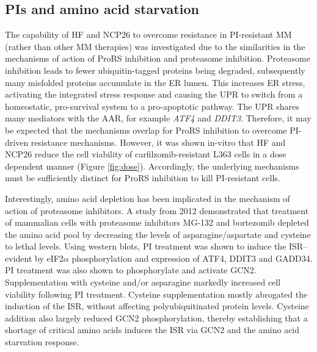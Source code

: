 \subsection{PIs and amino acid starvation}
The capability of HF and NCP26 to overcome resistance in PI-resistant MM (rather than other MM therapies) was investigated due to the similarities in the mechanisms of action of ProRS inhibition and proteasome inhibition.
Proteasome inhibition leads to fewer ubiquitin-tagged proteins being degraded, subsequently many misfolded proteins accumulate in the ER lumen.
This increases ER stress, activating the integrated stress response and causing the UPR to switch from a homeostatic, pro-survival system to a pro-apoptotic pathway\cite{kubiczkova2014proteasome, wallington2018resistance}.
The UPR shares many mediators with the AAR, for example \textit{ATF4} and \textit{DDIT3}.
Therefore, it may be expected that the mechanisms overlap for ProRS inhibition to overcome PI-driven resistance mechanisms.
However, it was shown in-vitro that HF and NCP26 reduce the cell viability of carfilzomib-resistant L363 cells in a dose dependent manner (Figure \ref{fig:dose}).
Accordingly, the underlying mechanisms must be sufficiently distinct for ProRS inhibition to kill PI-resistant cells.

Interestingly, amino acid depletion has been implicated in the mechanism of action of proteasome inhibitors\cite{suraweera2012failure}.
A study from 2012 demonstrated that treatment of mammalian cells with proteasome inhibitors MG-132 and bortezomib depleted the amino acid pool by decreasing the levels of asparagine/aspartate and cysteine to lethal levels\cite{suraweera2012failure}.
Using western blots, PI treatment was shown to induce the ISR-- evident by eIF2$\alpha$ phosphorylation and expression of ATF4, DDIT3 and GADD34.
PI treatment was also shown to phosphorylate and activate GCN2.
Supplementation with cysteine and/or asparagine markedly increased cell viability following PI treatment.
Cysteine supplementation mostly abrogated the induction of the ISR, without affecting polyubiquitinated protein levels.
Cysteine addition also largely reduced GCN2 phosphorylation, thereby establishing that a shortage of critical amino acids induces the ISR via GCN2 and the amino acid starvation response\cite{suraweera2012failure}.

